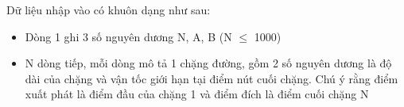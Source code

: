 Dữ liệu nhập vào có khuôn dạng như sau:
\begin{itemize}
	\item Dòng 1 ghi 3 số nguyên dương N, A, B (N  $\le$  1000)
	\item N dòng tiếp, mỗi dòng mô tả 1 chặng đường, gồm 2 số nguyên dương là độ dài của chặng và vận tốc giới hạn tại điểm nút cuối chặng. Chú ý rằng điểm xuất phát là điểm đầu của chặng 1 và điểm đích là điểm cuối chặng N
\end{itemize}